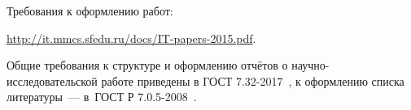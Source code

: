 

Требования к оформлению работ:
\begin{center}
    \url{http://it.mmcs.sfedu.ru/docs/IT-papers-2015.pdf}.
\end{center}

Общие требования к структуре и оформлению отчётов о научно-исследовательской
работе приведены в ГОСТ 7.32-2017~\cite{gost732}, к оформлению списка
литературы~--- в~ГОСТ Р 7.0.5-2008~\cite{gost705}.
